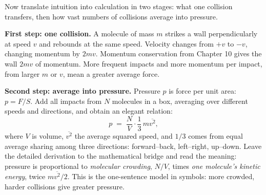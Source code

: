 
Now translate intuition into calculation in two stages: what one collision transfers, then how vast numbers of collisions average into pressure.

\textbf{First step: one collision.} A molecule of mass \(m\) strikes a wall perpendicularly at speed \(v\) and rebounds at the same speed. Velocity changes from \(+v\) to \(-v\), changing momentum by \(2mv\). Momentum conservation from Chapter 10 gives the wall \(2mv\) of momentum. More frequent impacts and more momentum per impact, from larger \(m\) or \(v\), mean a greater average force.

\textbf{Second step: average into pressure.} Pressure \(p\) is force per unit area: \(p = F/S\). Add all impacts from \(N\) molecules in a box, averaging over different speeds and directions, and obtain an elegant relation:
\[
p \;=\; \frac{N}{V}\cdot \frac{1}{3}\, m \overline{v^{2}},
\]
where \(V\) is volume, \(\overline{v^{2}}\) the average squared speed, and \(1/3\) comes from equal average sharing among three directions: forward--back, left--right, up--down. Leave the detailed derivation to the mathematical bridge and read the meaning: pressure is proportional to \emph{molecular crowding}, \(N/V\), times \emph{one molecule's kinetic energy}, twice \(m\overline{v^2}/2\). This is the one-sentence model in symbols: more crowded, harder collisions give greater pressure.

\begin{center}
\end{center}

